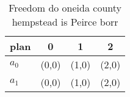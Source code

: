 \documentclass[a4paper]{article}
\begin{document}
\begin{table}
\begin{adjustbox}{width=0.6\columnwidth}
\begin{tabular}{|l|l|l|l|}
\hline
\textbf{plan} & \multicolumn{1}{c|}{\textbf{0}} & \multicolumn{1}{c|}{\textbf{1}} & \multicolumn{1}{c|}{\textbf{2}} \\ \hline
\textbf{$a_0$}  & (0,0) & (1,0) & (2,0) \\ \hline
\textbf{$a_1$}  & (0,0) & (1,0) & (2,0) \\ \hline
\end{tabular}
\end{adjustbox}
\caption{Freedom do oneida county hempstead is Peirce borr
}
\end{table}
\end{document}
